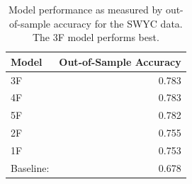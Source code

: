 \documentclass[man]{apa7}
\begin{document}
\begin{table}[ht]
\centering
\caption{\label{tab:swyc}Descriptive information for the SWYC data. The SWYC contains many versions which correspond to the age of the child. Each version has exactly 10 milestones, which we mapped to Kinedu's four milestone categories. Our data contain varying numbers of children.}
\end{table}

\begin{table}[ht]
\centering
\caption{\label{tab:swycresults}Model performance as measured by out-of-sample accuracy for the SWYC data. The 3F model performs best.}
\begin{tabular}{lr}
  \hline
Model & Out-of-Sample Accuracy \\
  \hline
  3F & 0.783 \\
  4F & 0.783 \\
  5F & 0.782 \\
  2F & 0.755 \\
  1F & 0.753 \\
  Baseline: & 0.678 \\
   \hline
\end{tabular}
\end{table}
\end{document}

